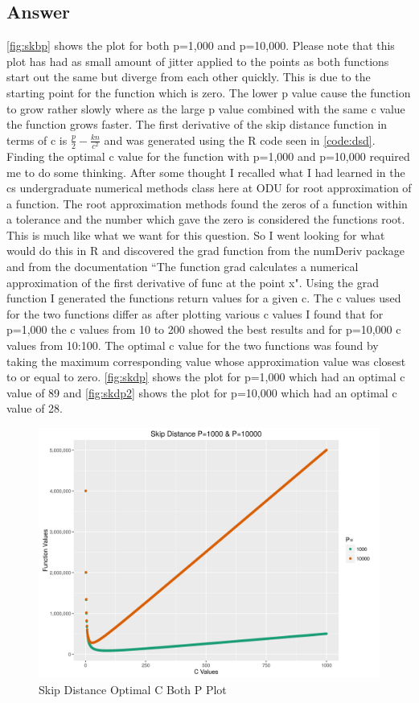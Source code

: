 \documentclass[11pt]{article}
\begin{document}
\subsection{Answer}
\autoref{fig:skbp} shows the plot for both p=1,000 and p=10,000. Please note that this plot has had as small amount of jitter applied to the points as both functions start out the same but diverge from each other quickly. This is due to the starting point for the function which is zero. The lower p value cause the function to grow rather slowly where as the large p value combined with the same c value the function grows faster. \newline \newline The first derivative of the skip distance function in terms of c is $\displaystyle \frac{p}{2}  - \frac{k n}{c ^{2}}$ and was generated using the R code seen in \autoref{code:dsd}. Finding the optimal c value for the function with p=1,000 and p=10,000 required me to do some thinking. After some thought I recalled what I had learned in the cs undergraduate numerical methods class here at ODU for root approximation of a function. The root approximation methods found the zeros of a function within a tolerance and the number which gave the zero is considered the functions root. This is much like what we want for this question. So I went looking for what would do this in R and discovered the grad function from the numDeriv package and from the documentation ``The function grad calculates a numerical approximation of the first derivative of func at the point x". Using the grad function I generated the functions return values for a given c. The c values used for the two functions differ as after plotting various c values I found that for p=1,000 the c values from 10 to 200 showed the best results and for p=10,000 c values from 10:100.  The optimal c value for the two functions was found by taking the maximum corresponding value whose approximation value was closest to or equal to zero. \autoref{fig:skdp} shows the plot for p=1,000 which had an optimal c value of 89 and \autoref{fig:skdp2} shows the plot for p=10,000 which had an optimal c value of 28.
\begin{figure}[h]
\includegraphics[width=\columnwidth]{code/skipDistanceBoth.png}
\caption{Skip Distance Optimal C Both P Plot}
\label{fig:skbp}
\end{figure}
\end{document}
